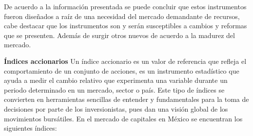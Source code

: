\documentclass[10pt,letterpaper]{book}
\begin{document}
\begin{description}
    De acuerdo a la información presentada se puede concluir que estos instrumentos fueron diseñados a raíz de una necesidad del mercado demandante de recursos, cabe destacar que los instrumentos son y serán susceptibles a cambios y reformas que se presenten. Además de surgir otros nuevos de acuerdo a la madurez del mercado.
\end{description}

\textbf{Índices accionarios}
Un índice accionario es un valor de referencia que refleja el comportamiento de un conjunto de acciones, es un instrumento estadístico que ayuda a medir el cambio relativo que experimenta una variable durante un periodo determinado en un mercado, sector o país. Este tipo de índices se convierten en herramientas sencillas de entender y fundamentales para la toma de decisiones por parte de los inversionistas, pues dan una visión global de los movimientos bursátiles. En el mercado de capitales en México se encuentran los siguientes índices:
\end{document}
